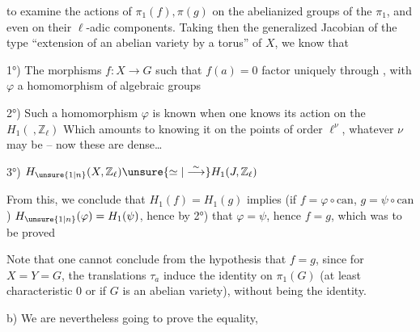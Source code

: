 to examine the actions of $\pi_1(f),\pi(g)$ on the abelianized groups of the $\pi_1$, and even on their $\ell$-adic components. Taking then the generalized Jacobian of the type ``extension of an abelian variety by a torus'' of $X$, we know that

1°) The morphisms $f:X\longrightarrow G$ such that $f(a)=0$ factor uniquely through
,
with $\varphi$ a homomorphism of algebraic groups

2°)  Such a homomorphism $\varphi$ is known when one knows its action on the $H_1(\ ,\mathbb Z_\ell)$ Which amounts to knowing it on the points of order $\ell^\nu$, whatever $\nu$ may be -- now these are dense\ldots

3°) $H_{\unsure{1|n}}(X,\mathbb Z_\ell)\unsure{\simeq|\overset{\sim}{\longrightarrow}}H_1(J,\mathbb Z_\ell)$

From this,  we conclude  that $H_1(f)=H_1(g)$ implies (if $f=\varphi\circ\mathrm{can}$, $g=\psi\circ\mathrm{can}$) $H_{\unsure{1|n}}(\varphi)=H_1(\psi)$, hence by 2°) that $\varphi=\psi$, hence $f=g$, which was to be proved

 Note that one cannot conclude from the hypothesis  that $f=g$, since for $X=Y=G$, the translations $\tau_a$ induce the identity on $\pi_1(G)$ (at least  characteristic $0$ or if $G$ is an abelian variety), without being the identity.

b) We are nevertheless going to prove the equality,
